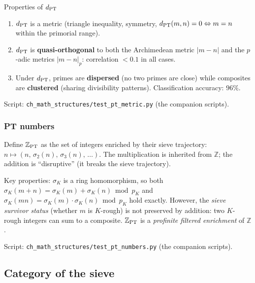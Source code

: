 \documentclass[12pt,a4paper]{article}
\begin{document}
\begin{thmbox}{Properties of $d_{\rm PT}$}
\label{thm:pt_metric}
\begin{enumerate}[nosep]
\item $d_{\rm PT}$ is a metric (triangle inequality, symmetry,
  $d_{\rm PT}(m,n) = 0 \Leftrightarrow m = n$ within the primorial range).
\item $d_{\rm PT}$ is \textbf{quasi-orthogonal} to both the
  Archimedean metric $|m - n|$ and the $p$-adic metrics $|m-n|_p$:
  correlation $< 0.1$ in all cases.
\item Under $d_{\rm PT}$, primes are \textbf{dispersed} (no two
  primes are close) while composites are \textbf{clustered} (sharing
  divisibility patterns). Classification accuracy: $96\%$.
\end{enumerate}
Script: \texttt{ch\_math\_structures/test\_pt\_metric.py} (the companion scripts).
\end{thmbox}

\subsubsection{PT numbers}

\begin{definition}
\label{def:pt_numbers}
Define $\mathbb{Z}_{\rm PT}$ as the set of integers enriched by
their sieve trajectory:
$n \mapsto (n,\, \sigma_2(n),\, \sigma_3(n),\, \ldots)$.
The multiplication is inherited from $\mathbb{Z}$; the addition
is ``disruptive'' (it breaks the sieve trajectory).
\end{definition}

Key properties: $\sigma_K$ is a ring homomorphism, so both
$\sigma_K(m+n) = \sigma_K(m) + \sigma_K(n) \bmod p_K$ and
$\sigma_K(mn) = \sigma_K(m) \cdot \sigma_K(n) \bmod p_K$ hold
exactly.  However, the \emph{sieve survivor status} (whether $m$
is $K$-rough) is not preserved by addition: two $K$-rough integers
can sum to a composite.  $\mathbb{Z}_{\rm PT}$ is a
\emph{profinite filtered enrichment} of $\mathbb{Z}$.

Script: \texttt{ch\_math\_structures/test\_pt\_numbers.py} (the companion scripts).


\subsection{Category of the sieve}
\label{sec:ms_category}
\end{document}
